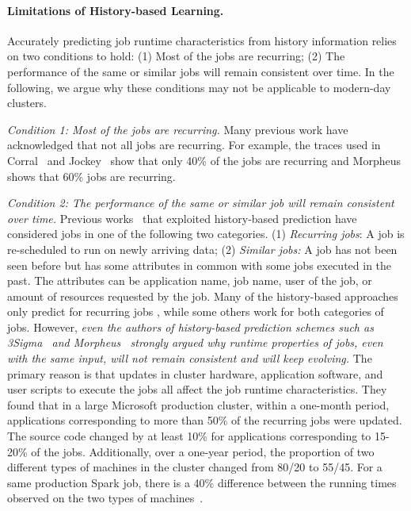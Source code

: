 \paragraph*{Limitations of History-based Learning.} Accurately predicting job runtime
characteristics from history information relies on two conditions to
hold: (1) Most of the jobs are recurring; (2) The performance of the
same or similar jobs will remain consistent over time. In the
following, we argue why these conditions may not be applicable to
modern-day clusters.
 
{\em Condition 1: Most of the jobs are recurring.}  Many previous work
have acknowledged that not all jobs are recurring. For example, the
traces used in Corral~\cite{corral} and Jockey~\cite{jockey:eurosys2012} show that only 40\% of the jobs are
recurring and Morpheus~\cite{morpheus} shows that 60\% jobs are
recurring.

{\em Condition 2: The performance of the same or similar job will remain
consistent over time.}
Previous works~\cite{3Sigma, morpheus, corral, jockey:eurosys2012} that exploited
history-based prediction have considered jobs in one of
the following two categories.
(1) {\em Recurring jobs}: A job is re-scheduled to run on newly arriving data;
(2) {\em Similar jobs:} A job has not been seen before but has some
attributes in common with some jobs executed in the past. The
attributes can be application name, job name, user of
the job, or amount of resources requested by the job.
Many of the history-based approaches only predict for recurring jobs \cite{morpheus, corral,
jockey:eurosys2012}, while some others \cite{3Sigma, jamiasvu, stratus:socc2018, roughSetEstimation:IEEE:Shonali} work for both categories of jobs.
%
However, \emph{even the authors of history-based prediction schemes such as
3Sigma~\cite{3Sigma} and Morpheus~\cite{morpheus} strongly argued why
runtime properties of jobs, even with the same input, will not remain consistent
and will keep evolving.}  The primary reason is that updates in cluster
hardware, application software, and user scripts to execute the jobs
all affect the job runtime characteristics.
{They found that}
in a large Microsoft production cluster, within a one-month period,
applications corresponding to more than 50\% of the recurring jobs were
updated. The source code changed by at least 10\% for applications
corresponding to 15-20\% of the jobs.  Additionally, over a one-year period,
the proportion of two different types of machines in the cluster
changed from 80/20 to 55/45. For a same production Spark job, there is
a 40\% difference between the running times observed on the two types of
machines~\cite{morpheus}. 

